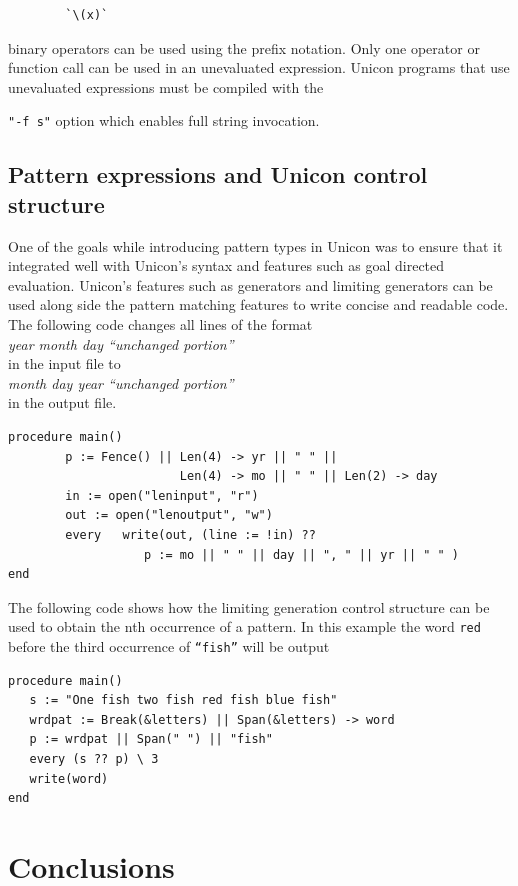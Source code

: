 \documentclass[letterpaper,12pt]{article}
\begin{document}
\begin{verbatim}
        `\(x)`
\end{verbatim}

\noindent binary operators can be used using the prefix notation. Only one
operator or function call can be used in an unevaluated
expression. Unicon programs that use unevaluated expressions must be
compiled with the {\texttt{"-f s"} option which enables full string invocation.

\subsection{Pattern expressions and Unicon control structure}

One of the goals while introducing pattern types in Unicon was to
ensure that it integrated well with Unicon's syntax and features such
as goal directed evaluation. Unicon’s features such as generators and
limiting generators can be used along side the pattern matching
features to write concise and readable code.
The following code changes all lines of the format \\
	\textit{year month day “unchanged portion”} \\
in the input file to \\
	\textit{month day year “unchanged portion”} \\
in the output file.

\begin{verbatim}
procedure main()
        p := Fence() || Len(4) -> yr || " " || 
                        Len(4) -> mo || " " || Len(2) -> day
        in := open("leninput", "r")
        out := open("lenoutput", "w")
        every	write(out, (line := !in) ?? 
                   p := mo || " " || day || ", " || yr || " " )
end
\end{verbatim}

The following code shows how the limiting generation control structure
can be used to obtain the nth occurrence of a pattern. In this example
the word \texttt{red} before the third occurrence of \texttt{“fish”}
will be output

\begin{verbatim}
procedure main()
   s := "One fish two fish red fish blue fish"
   wrdpat := Break(&letters) || Span(&letters) -> word
   p := wrdpat || Span(" ") || "fish"
   every (s ?? p) \ 3
   write(word)
end 
\end{verbatim}


\section{Conclusions}

}
\end{document}
